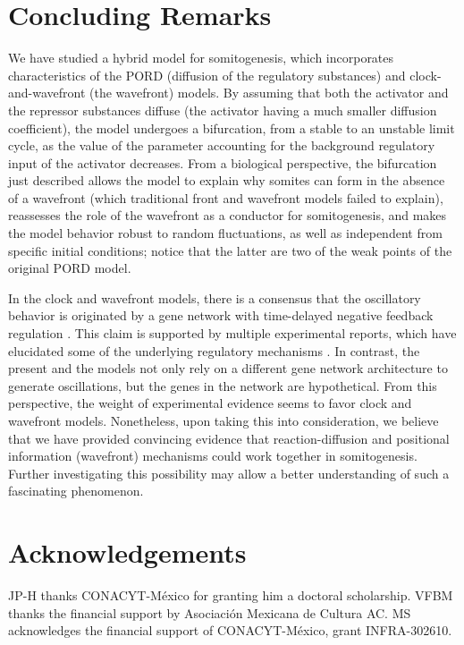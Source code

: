 \documentclass[11pt]{article}
\begin{document}
	
	\section{Concluding Remarks}
	\label{conclu}
	
	We have studied a hybrid model for somitogenesis, which incorporates 
	characteristics of the PORD (diffusion of the regulatory substances) and 
	clock-and-wavefront (the wavefront) models. By assuming that both the activator 
	and the repressor substances diffuse (the activator having a much smaller 
	diffusion coefficient), the model undergoes a bifurcation, from a stable to an 
	unstable limit cycle, as the value of the parameter accounting for the background
	regulatory input of the activator decreases. From a biological perspective, the
	bifurcation just described allows the model to explain why somites can form in
	the absence of a wavefront (which traditional front and wavefront models failed
	to explain), reassesses the role of the wavefront as a conductor for
	somitogenesis, and makes the model behavior robust to random fluctuations, as 
	well as independent from specific initial conditions;
	notice that the latter are two of the weak points of the original PORD model.  
	
	In the clock and wavefront models, there is a consensus that the oscillatory
	behavior is originated by a gene network with time-delayed negative feedback
	regulation \citep{Monk2003, Lewis2003}. This claim is supported by multiple
	experimental reports, which have elucidated some of the underlying regulatory
	mechanisms \citep{Schroter2012}. In contrast, the present and the
	\citet{Cotterell2015} models not only rely on a different gene network
	architecture to generate oscillations, but the genes in the network are
	hypothetical. From this perspective, the weight of experimental evidence seems
	to favor clock and wavefront models. Nonetheless, upon taking this into
	consideration, we
	believe that we have provided convincing evidence that reaction-diffusion and
	positional information (wavefront) mechanisms could work together in
	somitogenesis. Further investigating this possibility may allow a better
	understanding of such a fascinating phenomenon.
	
	
\section*{Acknowledgements}

JP-H thanks CONACYT-México for granting him a doctoral scholarship. VFBM thanks the financial support by Asociación Mexicana de Cultura AC. MS acknowledges the financial support of CONACYT-México, grant INFRA-302610. 
	
\end{document}
